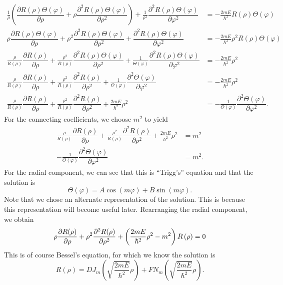 \documentclass[11pt]{report}
\newcommand{\fdel}[2]{\dfrac{\partial{#1}}{\partial {#2}}} %
\newcommand{\sdel}[2]{\dfrac{\partial^2{#1}}{\partial{#2}^2}} %
\newcommand{\fpar}[1]{\left({#1}\right)}
\begin{document}
\begin{align*}
    \frac{1}{\rho}\fpar{\fdel{R(\rho)\Theta(\varphi)}{\rho}+\rho\sdel{R(\rho)\Theta(\varphi)}{\rho}}+\frac{1}{\rho^2}\sdel{R(\rho)\Theta(\varphi)}{\varphi}  &= -\frac{2mE}{\hbar^2}R(\rho)\Theta(\varphi)\\
    \rho\fdel{R(\rho)\Theta(\varphi)}{\rho}+\rho^2\sdel{R(\rho)\Theta(\varphi)}{\rho}+\sdel{R(\rho)\Theta(\varphi)}{\varphi}  &= -\frac{2mE}{\hbar^2}\rho^2R(\rho)\Theta(\varphi)\\
    \frac{\rho}{R(\rho)}\fdel{R(\rho)}{\rho}+\frac{\rho^2}{R(\rho)}\sdel{R(\rho)\Theta(\varphi)}{\rho}+\frac{1}{\Theta\fpar{\varphi}}\sdel{R(\rho)\Theta(\varphi)}{\varphi}  &= -\frac{2mE}{\hbar^2}\rho^2\\
    \frac{\rho}{R(\rho)}\fdel{R(\rho)}{\rho}+\frac{\rho^2}{R(\rho)}\sdel{R(\rho)}{\rho}+\frac{1}{\Theta\fpar{\varphi}}\sdel{\Theta(\varphi)}{\varphi}  &= -\frac{2mE}{\hbar^2}\rho^2\\
    \frac{\rho}{R(\rho)}\fdel{R(\rho)}{\rho}+\frac{\rho^2}{R(\rho)}\sdel{R(\rho)}{\rho} +\frac{2mE}{\hbar^2}\rho^2 &=-\frac{1}{\Theta\fpar{\varphi}}\sdel{\Theta(\varphi)}{\varphi}.
\end{align*}
For the connecting coefficients, we choose $m^2$ to yield
\begin{align*}
    \frac{\rho}{R(\rho)}\fdel{R(\rho)}{\rho}+\frac{\rho^2}{R(\rho)}\sdel{R(\rho)}{\rho} +\frac{2mE}{\hbar^2}\rho^2 &= m^2\\
    -\frac{1}{\Theta\fpar{\varphi}}\sdel{\Theta(\varphi)}{\varphi} &= m^2.
\end{align*}
For the radial component, we can see that this is ``Trigg's'' equation and that the solution is
\begin{equation*}
    \Theta\fpar{\varphi} = A\cos\fpar{m\varphi}+B\sin\fpar{m\varphi}.    
\end{equation*}
Note that we chose an alternate representation of the solution. This is because this representation will become useful later. Rearranging the radial component, we obtain
\begin{equation*}
   \rho\fdel{R(\rho)}{\rho}+\rho^2\sdel{R(\rho)}{\rho} +\fpar{\frac{2mE}{\hbar^2}\rho^2 - m^2}R\fpar{\rho} = 0\\
\end{equation*}
This is of course Bessel's equation, for which we know the solution is
\begin{equation*}
    R(\rho) = DJ_m\fpar{\sqrt{\frac{2mE}{\hbar^2}}\rho}+FN_m\fpar{\sqrt{\frac{2mE}{\hbar^2}}\rho}.
\end{equation*}
\end{document}

